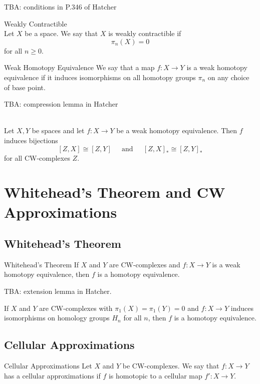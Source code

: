 \documentclass[a4paper]{article}
\begin{document}
TBA: conditions in P.346 of Hatcher

\begin{defn}{Weakly Contractible}{}\\
Let $X$ be a space. We say that $X$ is weakly contractible if $$\pi_n(X)=0$$ for all $n\geq 0$. 
\end{defn}

\begin{defn}{Weak Homotopy Equivalence}{} We say that a map $f:X\to Y$ is a weak homotopy equivalence if it induces isomorphisms on all homotopy groups $\pi_n$ on any choice of base point. 
\end{defn}

TBA: compression lemma in Hatcher

\begin{prp}{}{}\\
Let $X,Y$ be spaces and let $f:X\to Y$ be a weak homotopy equivalence. Then $f$ induces bijections $$[Z,X]\cong[Z,Y]\;\;\;\;\text{ and }\;\;\;\;[Z,X]_\ast\cong[Z,Y]_\ast$$ for all CW-complexes $Z$. 
\end{prp}

\pagebreak
\section{Whitehead's Theorem and CW Approximations}
\subsection{Whitehead's Theorem}
\begin{thm}{Whitehead's Theorem}{} If $X$ and $Y$ are CW-complexes and $f:X\to Y$ is a weak homotopy equivalence, then $f$ is a homotopy equivalence. 
\end{thm}

TBA: extension lemma in Hatcher. 

\begin{crl}{}{} If $X$ and $Y$ are CW-complexes with $\pi_1(X)=\pi_1(Y)=0$ and $f:X\to Y$ induces isomorphisms on homology groups $H_n$ for all $n$, then $f$ is a homotopy equivalence. 
\end{crl}

\subsection{Cellular Approximations}
\begin{defn}{Cellular Approximations}{} Let $X$ and $Y$ be CW-complexes. We say that $f:X\to Y$ has a cellular approximations if $f$ is homotopic to a cellular map $f':X\to Y$. 
\end{defn}
\end{document}
